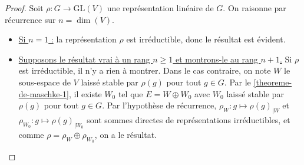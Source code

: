 	\begin{proof}
		Soit $\rho : G \rightarrow \mathrm{GL}(V)$ une représentation linéaire de $G$. On raisonne par récurrence sur $n = \dim(V)$.
		\begin{itemize}
			\item \uline{Si $n = 1$ :} la représentation $\rho$ est irréductible, donc le résultat est évident.
			\item \uline{Supposons le résultat vrai à un rang $n \geq 1$ et montrons-le au rang $n+1$.} Si $\rho$ est irréductible, il n'y a rien à montrer. Dans le cas contraire, on note $W$ le sous-espace de $V$ laissé stable par $\rho(g)$ pour tout $g \in G$. Par le \cref{theoreme-de-maschke-1}, il existe $W_0$ tel que $E = W \oplus W_0$ avec $W_0$ laissé stable par $\rho(g)$ pour tout $g \in G$. Par l'hypothèse de récurrence, $\rho_W : g \mapsto \rho(g)_{|W}$ et $\rho_{W_0} : g \mapsto \rho(g)_{|{W_0}}$ sont sommes directes de représentations irréductibles, et comme $\rho = \rho_W \oplus \rho_{W_0}$, on a le résultat.
		\end{itemize}
	\end{proof}

